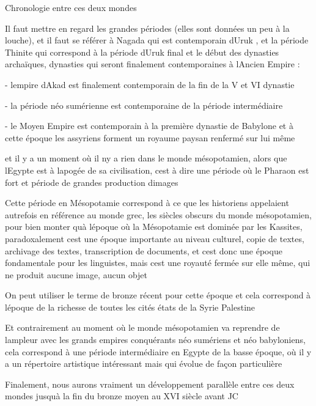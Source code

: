 \documentclass{article}
\begin{document}
Chronologie entre ces deux mondes 

Il faut mettre en regard les grandes périodes (elles sont données un peu
à la louche), et il faut se référer à Nagada qui est contemporain
d{\textquotesingle}Uruk , et la période Thinite qui correspond à la
période d{\textquotesingle}Uruk final et le début des dynasties
archaïques, dynasties qui seront finalement contemporaines à
l{\textquotesingle}Ancien Empire :

{}-  l{\textquotesingle}empire d{\textquotesingle}Akad est finalement
contemporain de la fin de la V et VI dynastie

{}- la période néo sumérienne est contemporaine de la période
intermédiaire

{}- le Moyen Empire est contemporain à la première dynastie de Babylone 
et à cette époque les assyriens forment un royaume paysan renfermé sur
lui même

et il y a un moment où il n{\textquotesingle}y a rien dans le monde
mésopotamien, alors que l{\textquotesingle}Egypte est à
l{\textquotesingle}apogée de sa civilisation, c{\textquotesingle}est à
dire une période où le Pharaon est fort et période de grandes
production d{\textquotesingle}images

Cette période en Mésopotamie correspond à ce que les historiens
appelaient autrefois en référence au monde grec,  les siècles obscurs
du monde mésopotamien, pour bien monter qu{\textquotesingle}à
l{\textquotesingle}époque où la Mésopotamie est dominée par les
Kassites, paradoxalement c{\textquotesingle}est une époque importante
au niveau culturel, copie de textes, archivage des textes,
transcription de documents, et c{\textquotesingle}est donc une époque
fondamentale pour les linguistes, mais c{\textquotesingle}est une
royauté fermée sur elle même, qui ne produit aucune image, aucun objet

On peut utiliser le terme de bronze récent pour cette époque et cela
correspond à l{\textquotesingle}époque de la richesse de toutes les
cités états de la  Syrie Palestine

Et contrairement au moment où le monde mésopotamien va reprendre de
l{\textquotesingle}ampleur avec les grands empires conquérants néo
sumériens et néo babyloniens, cela correspond à une période
intermédiaire en Egypte de la basse époque, où il y a un répertoire
artistique intéressant mais qui évolue de façon particulière

Finalement, nous aurons vraiment un développement parallèle entre ces
deux mondes jusqu{\textquotesingle}à la fin du bronze moyen au XVI
siècle avant JC
\end{document}
